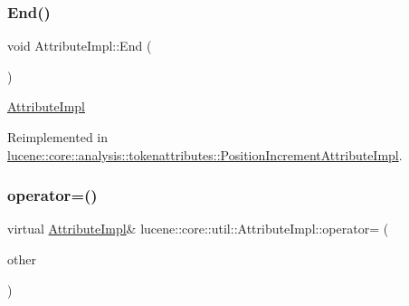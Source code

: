 \subsubsection{\texorpdfstring{End()}{End()}}
{\footnotesize\ttfamily void Attribute\+Impl\+::\+End (\begin{DoxyParamCaption}{ }\end{DoxyParamCaption})\hspace{0.3cm}{\ttfamily [virtual]}}

\mbox{\hyperlink{classlucene_1_1core_1_1util_1_1AttributeImpl}{Attribute\+Impl}} 

Reimplemented in \mbox{\hyperlink{classlucene_1_1core_1_1analysis_1_1tokenattributes_1_1PositionIncrementAttributeImpl_adb934ddcbf6f584c50a72c0980b88761}{lucene\+::core\+::analysis\+::tokenattributes\+::\+Position\+Increment\+Attribute\+Impl}}.

\mbox{\label{classlucene_1_1core_1_1util_1_1AttributeImpl_ab032e399d03ce2f58c76881cf2b92325}} 
\subsubsection{\texorpdfstring{operator=()}{operator=()}}
{\footnotesize\ttfamily virtual \mbox{\hyperlink{classlucene_1_1core_1_1util_1_1AttributeImpl}{Attribute\+Impl}}\& lucene\+::core\+::util\+::\+Attribute\+Impl\+::operator= (\begin{DoxyParamCaption}\item[{const \mbox{\hyperlink{classlucene_1_1core_1_1util_1_1AttributeImpl}{Attribute\+Impl}} \&}]{other }\end{DoxyParamCaption})\hspace{0.3cm}{\ttfamily [pure virtual]}}



